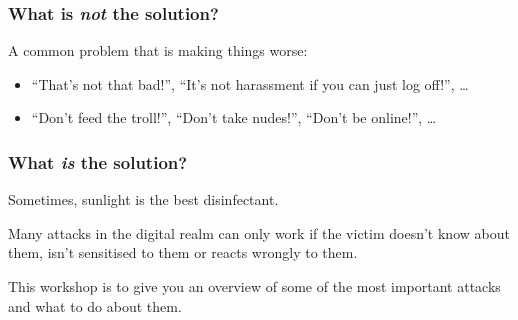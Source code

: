 \documentclass[aspectratio=1610,dvipsnames]{beamer}
\begin{document}
\begin{frame}
\frametitle{What is \emph{not} the solution?}

A common problem that is making things worse:
\bigskip

\begin{center}
\end{center}
\pause\bigskip

\begin{itemize}
\item ``That's not that bad!'', ``It's not harassment if you can just log off!'', \dots
\item ``Don't feed the troll!'', ``Don't take nudes!'', ``Don't be online!'', \dots
\end{itemize}
\end{frame}

\begin{frame}
\frametitle{What \emph{is} the solution?}
\begin{center}
\Large
Sometimes, sunlight is the best disinfectant.
\end{center}
\normalsize\bigskip

Many attacks in the digital realm can only work if the victim doesn't know about them, isn't sensitised to them or reacts wrongly to them.
\medskip\pause

This workshop is to give you an overview of some of the most important attacks and what to do about them.
\end{frame}
\end{document}
